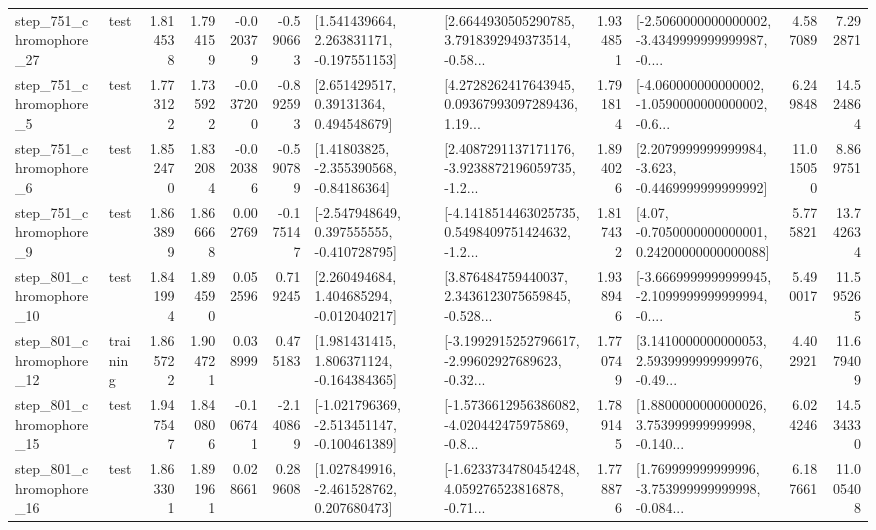 \begin{tabular}{llrrrrllrlrr}
  step\_751\_chromophore\_27 &      test &      1.814538 &    1.794159 &     -0.020379 & -0.590663 &    [1.541439664, 2.263831171, -0.197551153] &  [2.6644930505290785, 3.7918392949373514, -0.58... &       1.934851 &  [-2.5060000000000002, -3.4349999999999987, -0.... &            4.587089 &          7.292871 \\
   step\_751\_chromophore\_5 &      test &      1.773122 &    1.735922 &     -0.037200 & -0.892593 &      [2.651429517, 0.39131364, 0.494548679] &  [4.2728262417643945, 0.09367993097289436, 1.19... &       1.791814 &  [-4.060000000000002, -1.0590000000000002, -0.6... &            6.249848 &         14.524864 \\
   step\_751\_chromophore\_6 &      test &      1.852470 &    1.832084 &     -0.020386 & -0.590789 &     [1.41803825, -2.355390568, -0.84186364] &  [2.4087291137171176, -3.9238872196059735, -1.2... &       1.894026 &  [2.2079999999999984, -3.623, -0.4469999999999992] &           11.015050 &          8.869751 \\
   step\_751\_chromophore\_9 &      test &      1.863899 &    1.866668 &      0.002769 & -0.175147 &   [-2.547948649, 0.397555555, -0.410728795] &  [-4.1418514463025735, 0.5498409751424632, -1.2... &       1.817432 &   [4.07, -0.7050000000000001, 0.24200000000000088] &            5.775821 &         13.742634 \\
  step\_801\_chromophore\_10 &      test &      1.841994 &    1.894590 &      0.052596 &  0.719245 &    [2.260494684, 1.404685294, -0.012040217] &  [3.876484759440037, 2.3436123075659845, -0.528... &       1.938946 &  [-3.6669999999999945, -2.1099999999999994, -0.... &            5.490017 &         11.595265 \\
  step\_801\_chromophore\_12 &  training &      1.865722 &    1.904721 &      0.038999 &  0.475183 &    [1.981431415, 1.806371124, -0.164384365] &  [-3.1992915252796617, -2.99602927689623, -0.32... &       1.770749 &  [3.1410000000000053, 2.5939999999999976, -0.49... &            4.402921 &         11.679409 \\
  step\_801\_chromophore\_15 &      test &      1.947547 &    1.840806 &     -0.106741 & -2.140869 &  [-1.021796369, -2.513451147, -0.100461389] &  [-1.5736612956386082, -4.020442475975869, -0.8... &       1.789145 &  [1.8800000000000026, 3.753999999999998, -0.140... &            6.024246 &         14.534330 \\
  step\_801\_chromophore\_16 &      test &      1.863301 &    1.891961 &      0.028661 &  0.289608 &    [1.027849916, -2.461528762, 0.207680473] &  [-1.6233734780454248, 4.059276523816878, -0.71... &       1.778876 &  [1.769999999999996, -3.753999999999998, -0.084... &            6.187661 &         11.005408 \\

\end{tabular}
